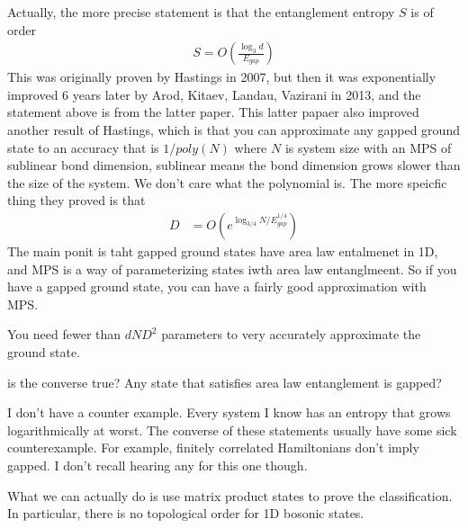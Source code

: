 Actually, the more precise statement is that the entanglement entropy $S$ is of
order
\begin{align}
    S = O\left( 
    \frac{\log_3 d}{E_{gap}}
    \right)
\end{align}
This was originally proven by Hastings in 2007,
but then it was exponentially improved 6 years later by
Arod, Kitaev, Landau, Vazirani in 2013,
and the statement above is from the latter paper.
This latter papaer also improved another result of Hastings,
which is that you can approximate any gapped ground state to an accuracy that is
$1/poly(N)$ where $N$ is system size with an MPS of sublinear bond dimension,
sublinear means the bond dimension grows slower than the size of the system.
We don't care what the polynomial is.
The more speicfic thing they proved is that
\begin{align}
    D &=
    O\left( 
    e^{\log_{3/4} N / E_{gap}^{1/4}}
    \right)
\end{align}
The main ponit is taht gapped ground states have area law entalmenet in 1D,
and MPS is a way of parameterizing states iwth area law entanglmeent.
So if you have a gapped ground state,
you can have a fairly good approximation with MPS.

You need fewer than $dND^2$ parameters to very accurately approximate the ground
state.

\begin{question}
    is the converse true?
    Any state that satisfies area law entanglement is gapped?
\end{question}
I don't have a counter example.
Every system I know has an entropy that grows logarithmically at worst.
The converse of these statements usually have some sick counterexample.
For example,
finitely correlated Hamiltonians don't imply gapped.
I don't recall hearing any for this one though.

What we can actually do is use matrix product states to prove the
classification.
In particular, there is no topological order for 1D bosonic states.
